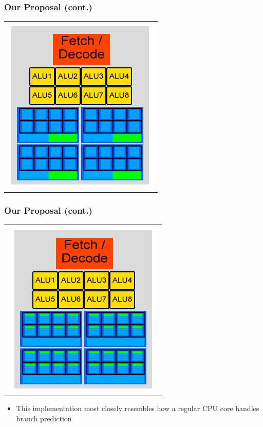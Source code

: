 \documentclass{beamer}
\begin{document}
\begin{frame}
	\frametitle{Our Proposal (cont.)}
	\begin{tabular}{c}
		\includegraphics[width=.5\textwidth]{Our-GPU---per-context-group-predictor.jpg}
	\end{tabular}
\end{frame}

\begin{frame}
	\frametitle{Our Proposal (cont.)}
	\begin{tabular}{c}
		\includegraphics[width=.5\textwidth]{Our-GPU---per-element-predictor.jpg}
	\end{tabular}
	\begin{itemize}
		\item<1-> This implementation most closely resembles how a regular CPU core handles branch prediction
	\end{itemize}
\end{frame}
\end{document}
